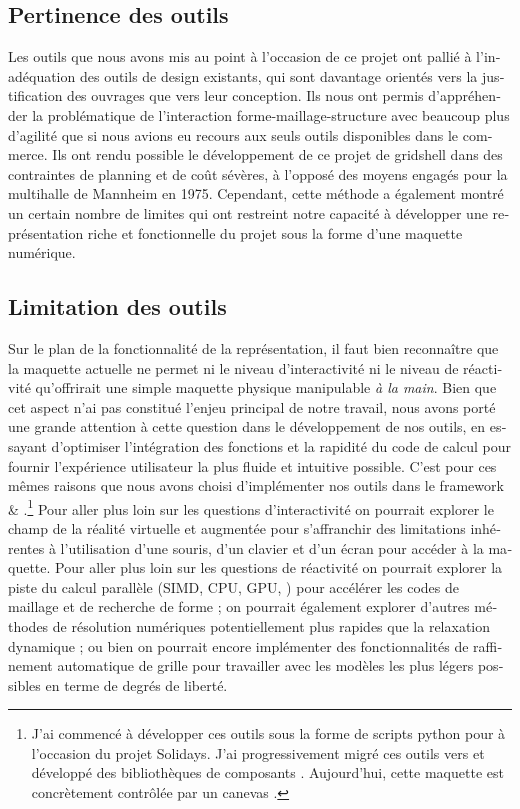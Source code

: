 \begin{otherlanguage}{french}
\subsection*{Pertinence des outils}

Les outils que nous avons mis au point à l'occasion de ce projet ont pallié à l'inadéquation des outils de design existants, qui sont davantage orientés vers la justification des ouvrages que vers leur conception. Ils nous ont permis d'appréhender la problématique de l'interaction forme-maillage-structure avec beaucoup plus d'agilité que si nous avions eu recours aux seuls outils disponibles dans le commerce. Ils ont rendu possible le développement de ce projet de gridshell dans des contraintes de planning et de coût sévères, à l'opposé des moyens engagés pour la multihalle de Mannheim en 1975. Cependant, cette méthode a également montré un certain nombre de limites qui ont restreint notre capacité à développer une représentation riche et fonctionnelle du projet sous la forme d'une maquette numérique.

\subsection*{Limitation des outils}

Sur le plan de la fonctionnalité de la représentation, il faut bien reconnaître que la maquette actuelle ne permet ni le niveau d'interactivité ni le niveau de réactivité qu'offrirait une simple maquette physique manipulable \emph{à la main}. Bien que cet aspect n'ai pas constitué l'enjeu principal de notre travail, nous avons porté une grande attention à cette question dans le développement de nos outils, en essayant d'optimiser l'intégration des fonctions et la rapidité du code de calcul pour fournir l'expérience utilisateur la plus fluide et intuitive possible. C'est pour ces mêmes raisons que nous avons choisi d'implémenter nos outils dans le framework \rhino{} \& \grasshopper{}.\footnote{J'ai commencé à développer ces outils sous la forme de scripts python pour \rhino{} à l'occasion du projet Solidays. J'ai progressivement migré ces outils vers \Csharp{} et développé des bibliothèques de composants \grasshopper{}. Aujourd'hui, cette maquette est concrètement contrôlée par un canevas \grasshopper{}.} Pour aller plus loin sur les questions d'interactivité on pourrait explorer le champ de la réalité virtuelle et augmentée pour s'affranchir des limitations inhérentes à l'utilisation d'une souris, d'un clavier et d'un écran pour accéder à la maquette. Pour aller plus loin sur les questions de réactivité on pourrait explorer la piste du calcul parallèle (SIMD, CPU, GPU, \telp{}) pour accélérer les codes de maillage et de recherche de forme ; on pourrait également explorer d'autres méthodes de résolution numériques potentiellement plus rapides que la relaxation dynamique ; ou bien on pourrait encore implémenter des fonctionnalités de raffinement automatique de grille pour travailler avec les modèles les plus légers possibles en terme de degrés de liberté.


\end{otherlanguage}
